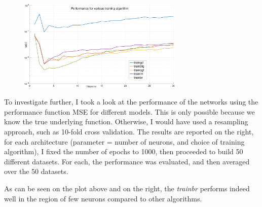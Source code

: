 \documentclass[11pt, a4paper]{article}
\begin{document}
\begin{figure}
  \vspace{-30pts}
  \begin{center}
    \includegraphics[width=0.7\textwidth]{true_mse_perf.pdf}
  \end{center}
\end{figure}

To investigate further, I took a look at the performance of the
networks using the performance function MSE for different models. This
is only possible because we know the true underlying
function. Otherwise, I would have used a resampling approach, such as
10-fold cross validation. The results are reported on the right, for
each architecture (parameter = number of neurons, and choice of
training algorithm), I fixed the number of epochs to 1000, then
proceeded to build 50 different datasets. For each, the performance
was evaluated, and then averaged over the 50 datasets.

As can be seen on the plot above and on the right, the \emph{trainbr}
performs indeed well in the region of few neurons compared to other
algorithms.
\end{document}
